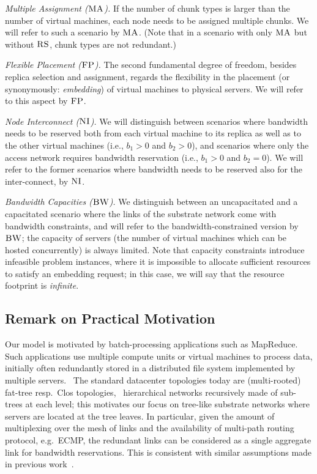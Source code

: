 \documentclass[9pt]{sigcomm-alternate}
\newcommand{\CC}{\textsc{NI}}
\newcommand{\FP}{\textsc{FP}}
\newcommand{\RS}{\textsc{RS}}
\newcommand{\BW}{\textsc{BW}}
\newcommand{\MA}{\textsc{MA}}
\newcommand{\CostTrans}{\ensuremath{b_1}}
\newcommand{\CostCom}{\ensuremath{b_2}}
\begin{document}
\emph{Multiple Assignment ($\MA$).}
If the number of chunk types is larger than the number of virtual machines,
each node needs to be assigned multiple chunks. We will refer to such a scenario by $\MA$.
(Note that in a scenario with only $\MA$ but without $\RS$, chunk types are not redundant.)

\emph{Flexible Placement ($\FP$).} The second fundamental degree of freedom, besides replica selection and assignment,
regards the flexibility in the placement (or synonymously: \emph{embedding}) of virtual machines to physical servers.
We will refer to this aspect by $\FP$.

\emph{Node Interconnect ($\CC$).} We will distinguish between scenarios where bandwidth needs to be reserved
both from each virtual machine to its replica as well as to the other virtual machines
(i.e., $\CostTrans>0$ and $\CostCom>0$), and
 scenarios where only the access network requires bandwidth reservation (i.e., $\CostTrans>0$ and $\CostCom=0$).
 We will refer to the former scenarios
where bandwidth needs to be reserved also for the inter-connect, by $\CC$.

\emph{Bandwidth Capacities ($\BW$).} We distinguish between an uncapacitated and a capacitated scenario where the links
of the substrate network come with bandwidth
constraints, and will refer to the bandwidth-constrained version by $\BW$; the capacity of servers
(the number of virtual machines which can be hosted concurrently) is always limited.
Note that capacity constraints introduce infeasible problem instances, where it is impossible to
allocate sufficient resources to satisfy an embedding request; in this case, we will say that the
resource footprint is \emph{infinite}.


\subsection{Remark on Practical Motivation}\label{ssec:practice}

Our model is motivated by batch-processing applications such as MapReduce.
Such applications use multiple compute units or virtual machines to
process data, initially often redundantly stored in a distributed file system implemented
by multiple servers.~\cite{mapreduce}
The standard datacenter topologies today are (multi-rooted) fat-tree resp.~Clos topologies,~\cite{vl2,fattree}
hierarchical networks  recursively made of sub-trees at each level; this motivates our 
focus on tree-like substrate networks where servers are located at the
tree leaves. In particular, given the amount of multiplexing over the mesh of links
and the availability of multi-path routing protocol, e.g.~ECMP, the redundant
links can be considered as a single aggregate link for bandwidth
reservations. This is consistent with similar assumptions made in
previous work~\cite{oktopus,proteus}.
\end{document}
